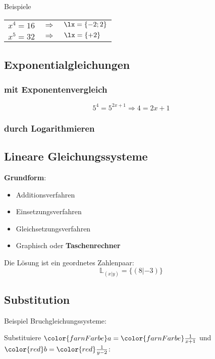 \begin{multicols}{2}
Beispiele

\begin{tabular}{rcl}
$x^4=16$ & $\Longrightarrow$ & $\lx=\{-2; 2\}  $ \\
$x^5=32$ & $\Longrightarrow$ & $\lx=\{+2\}  $ \\

\end{tabular}

\subsection*{Exponentialgleichungen}
\subsubsection*{mit Exponentenvergleich}

$$5^4 = 5^{2x+1} \Longrightarrow  4=2x+1$$

\subsubsection*{durch Logarithmieren}


\subsection*{Lineare Gleichungssysteme}
\textbf{Grundform}:

\begin{itemize}
\item Additionsverfahren
\item Einsetzungsverfahren
\item Gleichsetzungsverfahren
\item Graphisch oder \textbf{Taschenrechner}
\end{itemize}
Die Lösung ist ein geordnetes Zahlenpaar:
$$\mathbb{L}_{(x | y)} = \{(8 | -3)\}$$



\headerUndFooterJedeSeite{}

\subsection*{Substitution}
Beispiel Bruchgleichungssysteme:

Substituiere
${\color{farnFarbe}a}={\color{farnFarbe}\frac1{x+1}}$ und
${\color{red}b} = {\color{red}\frac1{y-2}}$:


\end{multicols}
